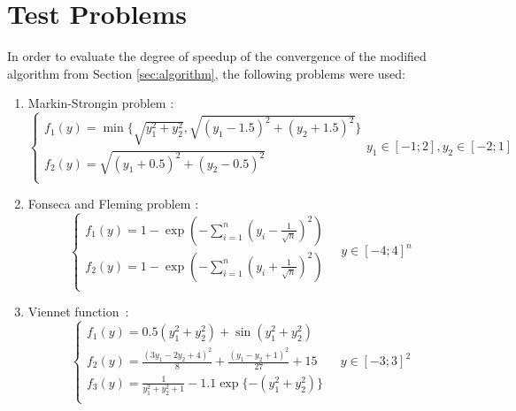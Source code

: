 \documentclass{llncs}
\begin{document}
\section{Test Problems}
\label{sec:test_problems}
In order to evaluate the degree of speedup of the convergence of the modified algorithm from
Section \ref{sec:algorithm}, the following problems were used:
\begin{enumerate}
  \item Markin-Strongin problem \cite{markinStrongin1993}:
    \begin{equation}
      \left \{
      \begin{array}{l}
        f_1(y) = \min\{\sqrt{y_1^2+y_2^2},\sqrt{(y_1-1.5)^2+(y_2+1.5)^2}\} \\
        f_2(y)=\sqrt{(y_1+0.5)^2+(y_2-0.5)^2} \\
      \end{array}
      \right .
      y_1\in [-1;2],y_2\in [-2;1]
    \end{equation}
  \item Fonseca and Fleming problem \cite{Huband2006}:
  \begin{equation}
    \label{eq:fonseca}
    \left \{
    \begin{array}{l}
      f_{1}\left(y\right) = 1 - \exp \left(-\sum_{i=1}^{n} \left(y_{i} - \frac{1}{\sqrt{n}}
\right)^{2} \right) \\
      f_{2}\left(y\right) = 1 - \exp \left(-\sum_{i=1}^{n} \left(y_{i} + \frac{1}{\sqrt{n}}
\right)^{2} \right) \\
    \end{array}
    \right .
    \quad y\in [-4;4]^n
  \end{equation}
  \item
  Viennet function~\cite{Huband2006}:
  \begin{equation}
    \left \{
    \begin{array}{l}
      f_{1}\left(y\right) = 0.5(y_1^2 + y_2^2) + \sin(y_1^2 + y_2^2)\\
      f_{2}\left(y\right) = \frac{(3y_1 - 2y_2 + 4)^2}{8} + \frac{(y_1-y_2 + 1)^2}{27} + 15\\
      f_{3}\left(y\right) = \frac{1}{y_1^2+y_2^2 + 1} -1.1 \exp\{-(y_1^2+y_2^2)\}\\
    \end{array}
    \right .
    \quad y\in [-3;3]^2
  \end{equation}

\end{enumerate}
\end{document}
